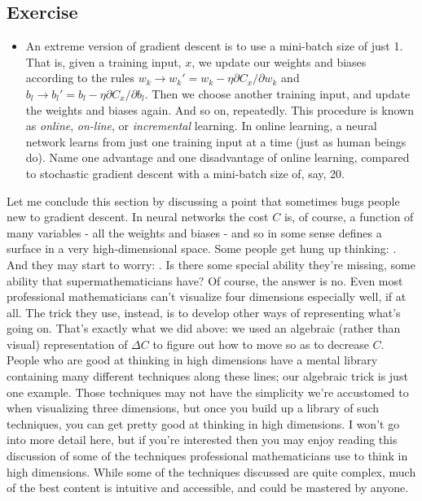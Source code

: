 \subsection*{Exercise}
\label{subs: Exercises mini-batch size 1}

\begin{itemize}
\item An extreme version of gradient descent is to use a mini-batch size of just 1. That is, given a training input, $x$, we update our weights and biases according to the rules $w_k\rightarrow w_k'=w_k-\eta \partial C_x/\partial w_k$ and $b_l\rightarrow b_l'=b_l-\eta \partial C_x/\partial b_l$. Then we choose another training input, and update the weights and biases again. And so on, repeatedly. This procedure is known as \textit{online}, \textit{on-line}, or \textit{incremental} learning. In online learning, a neural network learns from just one training input at a time (just as human beings do). Name one advantage and one disadvantage of online learning, compared to stochastic gradient descent with a mini-batch size of, say, 20.
\end{itemize}

Let me conclude this section by discussing a point that sometimes bugs people new to gradient descent. In neural networks the cost $C$ is, of course, a function of many variables - all the weights and biases - and so in some sense defines a surface in a very high-dimensional space. Some people get hung up thinking: . And they may start to worry: . Is there some special ability they're missing, some ability that  supermathematicians have? Of course, the answer is no. Even most professional mathematicians can't visualize four dimensions especially well, if at all. The trick they use, instead, is to develop other ways of representing what's going on. That's exactly what we did above: we used an algebraic (rather than visual) representation of $\Delta C$ to figure out how to move so as to decrease $C$. People who are good at thinking in high dimensions have a mental library containing many different techniques along these lines; our algebraic trick is just one example. Those techniques may not have the simplicity we're accustomed to when visualizing three dimensions, but once you build up a library of such techniques, you can get pretty good at thinking in high dimensions. I won't go into more detail here, but if you're interested then you may enjoy reading this discussion of some of the techniques professional mathematicians use to think in high dimensions. While some of the techniques discussed are quite complex, much of the best content is intuitive and accessible, and could be mastered by anyone.

